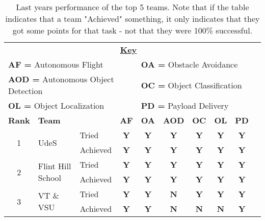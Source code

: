 \documentclass[]{auvsi_doc}
\begin{document}
\begin{table}[h!]
	
	\caption{Last years performance of the top 5 teams. Note that if the table indicates that a team "Achieved" something, it only indicates that they got some points for that task - not that they were 100\% successful.}
	\centering
	\begin{tabular}{ cllccccccc }
		\multicolumn{9}{c}{\textbf{\underline{Key}}} \\
		\multicolumn{4}{l}{\textbf{AF =} Autonomous Flight} & \multicolumn{5}{l}{\textbf{OA =} Obstacle Avoidance} \\
		\multicolumn{4}{l}{\textbf{AOD =} Autonomous Object Detection} & \multicolumn{5}{l}{\textbf{OC =} Object Classification} \\
		\multicolumn{4}{l}{\textbf{OL =} Object Localization} & \multicolumn{5}{l}{\textbf{PD =} Payload Delivery} \\
		\hline
		\textbf{Rank} 	& \textbf{Team} 	&  	& \textbf{AF}  	& \textbf{OA} 	& \textbf{AOD}  	& \textbf{OC} 	& \textbf{OL} 	& \textbf{PD} \\
		\hline
		\multirow{2}{*}{1} 		& \multirow{2}{*}{UdeS} 				& Tried 		& \color{dg}\textbf{Y } 	& \color{dg}\textbf{Y}  	& \color{dg}\textbf{Y} 	& \color{dg}\textbf{Y} 	& \color{dg}\textbf{Y}  	& \color{dg}\textbf{Y}  \\
	 	  					&  								& Achieved	& \color{dg}\textbf{Y} 	& \color{dg}\textbf{Y}  	& \color{dg}\textbf{Y} 	& \color{dg}\textbf{Y} 	& \color{dg}\textbf{Y}  	& \color{dg}\textbf{Y}  \\
		\hline
		\multirow{2}{*}{2} 		& \multirow{2}{*}{Flint Hill School} 		& Tried		& \color{dg}\textbf{Y} 	& \color{dg}\textbf{Y}  	& \color{dg}\textbf{Y} 	& \color{dg}\textbf{Y} 	& \color{dg}\textbf{Y}  	& \color{dg}\textbf{Y}  \\
	 	  					&  								& Achieved	& \color{dg}\textbf{Y} 	& \color{dg}\textbf{Y}  	& \color{dg}\textbf{Y} 	& \color{dg}\textbf{Y} 	& \color{dg}\textbf{Y}  	& \color{dg}\textbf{Y}  \\		
		\hline
		\multirow{2}{*}{3} 		& \multirow{2}{*}{VT \& VSU} 			& Tried		& \color{dg}\textbf{Y} 	& \color{dg}\textbf{Y}  	& \color{red}\textbf{N} 	& \color{dg}\textbf{Y} 	& \color{dg}\textbf{Y}  	& \color{dg}\textbf{Y}  \\	 	  							&  								& Achieved	& \color{dg}\textbf{Y} 	& \color{dg}\textbf{Y}  	& \color{red}\textbf{N} 	& \color{red}\textbf{N} 	& \color{red}\textbf{N}  	& \color{dg}\textbf{Y}  \\		

\end{tabular}
\end{table}
\end{document}
